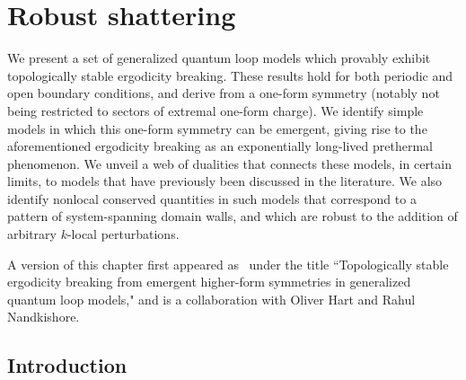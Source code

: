 
\chapter{Robust shattering}\label{chp:loops}


We present a set of generalized quantum loop models which provably exhibit topologically stable ergodicity breaking. These results hold for both periodic and open boundary conditions, and derive from a one-form symmetry (notably not being restricted to sectors of extremal one-form charge). We identify simple models in which this one-form symmetry can be emergent, giving rise to the aforementioned ergodicity breaking as an exponentially long-lived prethermal phenomenon. We unveil a web of dualities that connects these models, in certain limits, to models that have previously been discussed in the literature. We also identify nonlocal conserved quantities in such models that correspond to a pattern of system-spanning domain walls, and which are robust to the addition of arbitrary $k$-local perturbations.



A version of this chapter first appeared as~\cite{Stahl2024Loops} under the title ``Topologically stable ergodicity breaking from emergent higher-form symmetries in generalized quantum loop models," and is a collaboration with Oliver Hart and Rahul Nandkishore.






\section{Introduction}


